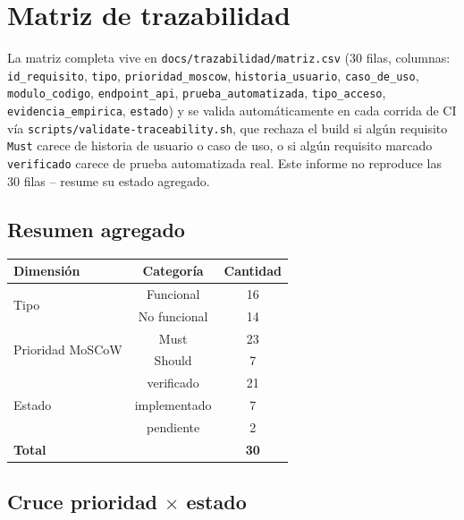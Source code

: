 \documentclass[12pt,a4paper]{article}
\begin{document}
\section{Matriz de trazabilidad}

La matriz completa vive en \texttt{docs/trazabilidad/matriz.csv}
(30 filas, columnas: \texttt{id\_requisito}, \texttt{tipo},
\texttt{prioridad\_moscow}, \texttt{historia\_usuario},
\texttt{caso\_de\_uso}, \texttt{modulo\_codigo}, \texttt{endpoint\_api},
\texttt{prueba\_automatizada}, \texttt{tipo\_acceso},
\texttt{evidencia\_empirica}, \texttt{estado}) y se valida
automáticamente en cada corrida de CI vía
\texttt{scripts/validate-traceability.sh}, que rechaza el build si algún
requisito \texttt{Must} carece de historia de usuario o caso de uso, o si
algún requisito marcado \texttt{verificado} carece de prueba automatizada
real. Este informe no reproduce las 30 filas -- resume su estado
agregado.

\subsection{Resumen agregado}

\begin{center}
\begin{tabular}{|l|c|c|}
\hline
\rowcolor{verdeuteq}
\color{white}\textbf{Dimensión} & \color{white}\textbf{Categoría} & \color{white}\textbf{Cantidad} \\
\hline
\multirow{2}{*}{Tipo} & Funcional & 16 \\
 & No funcional & 14 \\
\hline
\multirow{2}{*}{Prioridad MoSCoW} & Must & 23 \\
 & Should & 7 \\
\hline
\multirow{3}{*}{Estado} & verificado & 21 \\
 & implementado & 7 \\
 & pendiente & 2 \\
\hline
\textbf{Total} & & \textbf{30} \\
\hline
\end{tabular}
\end{center}

\subsection{Cruce prioridad $\times$ estado}
\end{document}
